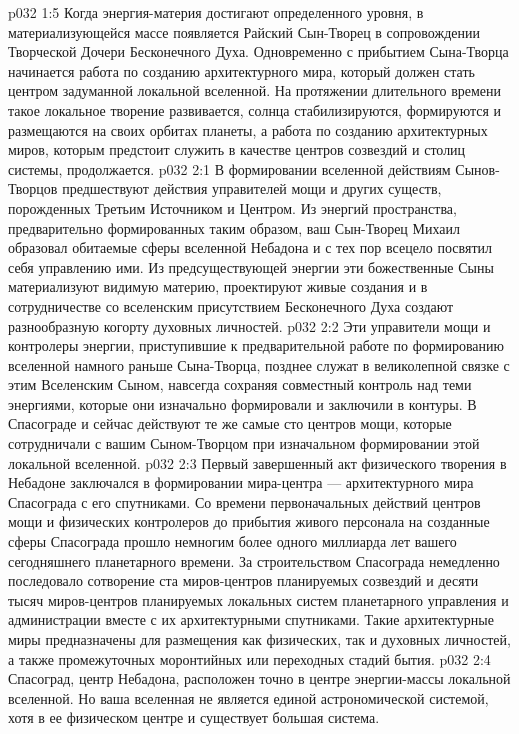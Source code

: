 \vs p032 1:5 \pc Когда энергия\hyp{}материя достигают определенного уровня, в материализующейся массе появляется Райский Сын\hyp{}Творец в сопровождении Творческой Дочери Бесконечного Духа. Одновременно с прибытием Сына\hyp{}Творца начинается работа по созданию архитектурного мира, который должен стать центром задуманной локальной вселенной. На протяжении длительного времени такое локальное творение развивается, солнца стабилизируются, формируются и размещаются на своих орбитах планеты, а работа по созданию архитектурных миров, которым предстоит служить в качестве центров созвездий и столиц системы, продолжается.
\vs p032 2:1 В формировании вселенной действиям Сынов\hyp{}Творцов предшествуют действия управителей мощи и других существ, порожденных Третьим Источником и Центром. Из энергий пространства, предварительно формированных таким образом, ваш Сын\hyp{}Творец Михаил образовал обитаемые сферы вселенной Небадона и с тех пор всецело посвятил себя управлению ими. Из предсуществующей энергии эти божественные Сыны материализуют видимую материю, проектируют живые создания и в сотрудничестве со вселенским присутствием Бесконечного Духа создают разнообразную когорту духовных личностей.
\vs p032 2:2 Эти управители мощи и контролеры энергии, приступившие к предварительной работе по формированию вселенной намного раньше Сына\hyp{}Творца, позднее служат в великолепной связке с этим Вселенским Сыном, навсегда сохраняя совместный контроль над теми энергиями, которые они изначально формировали и заключили в контуры. В Спасограде и сейчас действуют те же самые сто центров мощи, которые сотрудничали с вашим Сыном\hyp{}Творцом при изначальном формировании этой локальной вселенной.
\vs p032 2:3 \pc Первый завершенный акт физического творения в Небадоне заключался в формировании мира\hyp{}центра --- архитектурного мира Спасограда с его спутниками. Со времени первоначальных действий центров мощи и физических контролеров до прибытия живого персонала на созданные сферы Спасограда прошло немногим более одного миллиарда лет вашего сегодняшнего планетарного времени. За строительством Спасограда немедленно последовало сотворение ста миров\hyp{}центров планируемых созвездий и десяти тысяч миров\hyp{}центров планируемых локальных систем планетарного управления и администрации вместе с их архитектурными спутниками. Такие архитектурные миры предназначены для размещения как физических, так и духовных личностей, а также промежуточных моронтийных или переходных стадий бытия.
\vs p032 2:4 Спасоград, центр Небадона, расположен точно в центре энергии\hyp{}массы локальной вселенной. Но ваша вселенная не является единой астрономической системой, хотя в ее физическом центре и существует большая система.

